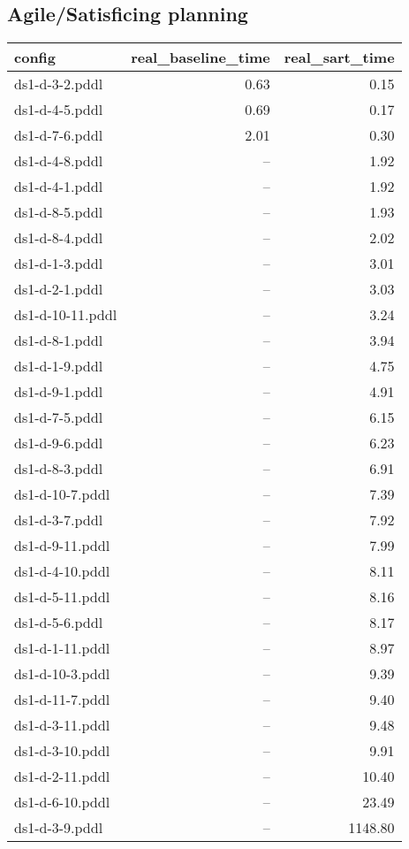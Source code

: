 \documentclass{article}
\begin{document}
                    \subsection*{Agile/Satisficing planning}
                    
                            \begin{center}
                            \scriptsize
                            \begin{tabular}{@{}l|r|r@{}}
                            config & real\_baseline\_time & real\_sart\_time\\\midrule
                             ds1-d-3-2.pddl&0.63&0.15\\
 ds1-d-4-5.pddl&0.69&0.17\\
 ds1-d-7-6.pddl&2.01&0.30\\
 ds1-d-4-8.pddl&--&1.92\\
 ds1-d-4-1.pddl&--&1.92\\
 ds1-d-8-5.pddl&--&1.93\\
 ds1-d-8-4.pddl&--&2.02\\
 ds1-d-1-3.pddl&--&3.01\\
 ds1-d-2-1.pddl&--&3.03\\
 ds1-d-10-11.pddl&--&3.24\\
 ds1-d-8-1.pddl&--&3.94\\
 ds1-d-1-9.pddl&--&4.75\\
 ds1-d-9-1.pddl&--&4.91\\
 ds1-d-7-5.pddl&--&6.15\\
 ds1-d-9-6.pddl&--&6.23\\
 ds1-d-8-3.pddl&--&6.91\\
 ds1-d-10-7.pddl&--&7.39\\
 ds1-d-3-7.pddl&--&7.92\\
 ds1-d-9-11.pddl&--&7.99\\
 ds1-d-4-10.pddl&--&8.11\\
 ds1-d-5-11.pddl&--&8.16\\
 ds1-d-5-6.pddl&--&8.17\\
 ds1-d-1-11.pddl&--&8.97\\
 ds1-d-10-3.pddl&--&9.39\\
 ds1-d-11-7.pddl&--&9.40\\
 ds1-d-3-11.pddl&--&9.48\\
 ds1-d-3-10.pddl&--&9.91\\
 ds1-d-2-11.pddl&--&10.40\\
 ds1-d-6-10.pddl&--&23.49\\
 ds1-d-3-9.pddl&--&1148.80
                            \end{tabular}
                            \end{center}
                    
\end{document}
